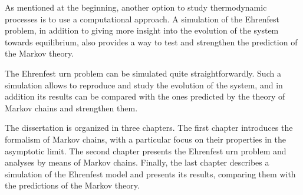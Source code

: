 As mentioned at the beginning, another option to study thermodynamic processes is to use a computational approach. A simulation of the Ehrenfest problem, in addition to giving more insight into the evolution of the system towards equilibrium, also provides a way to test and strengthen the prediction of the Markov theory.

The Ehrenfest urn problem can be simulated quite straightforwardly. Such a simulation allows to reproduce and study the evolution of the system, and in addition its results can be compared with the ones predicted by the theory of Markov chains and strengthen them.

The dissertation is organized in three chapters. The first chapter introduces the formalism of Markov chains, with a particular focus on their properties in the asymptotic limit. The second chapter presents the Ehrenfest urn problem and analyses by means of Markov chains. Finally, the last chapter describes a simulation of the Ehrenfest model and presents its results, comparing them with the predictions of the Markov theory. 